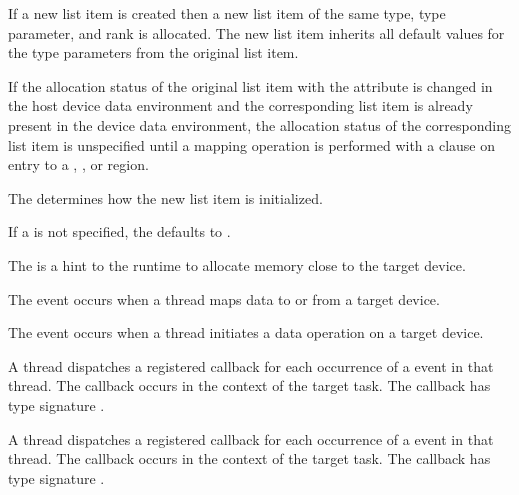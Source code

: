 \begin{fortranspecific}
If a new list item is created then a new list item of the same type, type parameter, and
rank is allocated.  The new list item inherits all default values for
the type parameters from the original list item.

If the allocation status of the original list item with the
 attribute is changed in the host device data
environment and the corresponding list item is already present in the
device data environment, the allocation status of the corresponding
list item is unspecified until a mapping operation is performed with a
 clause on entry to a , , or
 region.
\end{fortranspecific}

The  determines how the new list item is initialized.

If a  is not specified, the  defaults to .

The   is a hint to the runtime to allocate memory close to the target device.

\events
The  event occurs when a thread maps data to or from a target device.

The  event occurs when a thread initiates a data operation on a target device.

\tools

A thread dispatches a registered 
callback for each occurrence of a  event in that thread.
The callback occurs in the context of the target task.  The callback has type signature
.

A thread dispatches a registered 
callback for each occurrence of a  event in that thread.
The callback occurs in the context of the target task.  The callback has type signature
.

